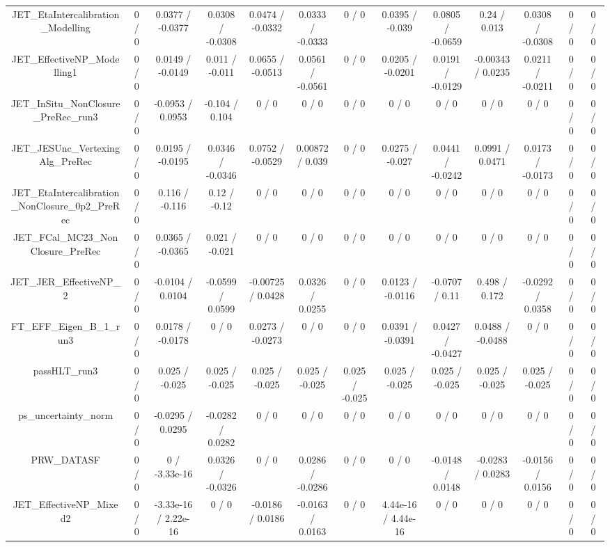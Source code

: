 \documentclass[10pt]{article}
\begin{document}
\begin{table}[htbp]
\begin{center}
\begin{tabular}{|c|c|c|c|c|c|c|c|c|c|c|c|c|}
  JET_EtaIntercalibration_Modelling & 0 / 0 & 0.0377 / -0.0377 & 0.0308 / -0.0308 & 0.0474 / -0.0332 & 0.0333 / -0.0333 & 0 / 0 & 0.0395 / -0.039 & 0.0805 / -0.0659 & 0.24 / 0.013 & 0.0308 / -0.0308 & 0 / 0 & 0 / 0 \\ 
  JET_EffectiveNP_Modelling1 & 0 / 0 & 0.0149 / -0.0149 & 0.011 / -0.011 & 0.0655 / -0.0513 & 0.0561 / -0.0561 & 0 / 0 & 0.0205 / -0.0201 & 0.0191 / -0.0129 & -0.00343 / 0.0235 & 0.0211 / -0.0211 & 0 / 0 & 0 / 0 \\ 
  JET_InSitu_NonClosure_PreRec_run3 & 0 / 0 & -0.0953 / 0.0953 & -0.104 / 0.104 & 0 / 0 & 0 / 0 & 0 / 0 & 0 / 0 & 0 / 0 & 0 / 0 & 0 / 0 & 0 / 0 & 0 / 0 \\ 
  JET_JESUnc_VertexingAlg_PreRec & 0 / 0 & 0.0195 / -0.0195 & 0.0346 / -0.0346 & 0.0752 / -0.0529 & 0.00872 / 0.039 & 0 / 0 & 0.0275 / -0.027 & 0.0441 / -0.0242 & 0.0991 / 0.0471 & 0.0173 / -0.0173 & 0 / 0 & 0 / 0 \\ 
  JET_EtaIntercalibration_NonClosure_0p2_PreRec & 0 / 0 & 0.116 / -0.116 & 0.12 / -0.12 & 0 / 0 & 0 / 0 & 0 / 0 & 0 / 0 & 0 / 0 & 0 / 0 & 0 / 0 & 0 / 0 & 0 / 0 \\ 
  JET_FCal_MC23_NonClosure_PreRec & 0 / 0 & 0.0365 / -0.0365 & 0.021 / -0.021 & 0 / 0 & 0 / 0 & 0 / 0 & 0 / 0 & 0 / 0 & 0 / 0 & 0 / 0 & 0 / 0 & 0 / 0 \\ 
  JET_JER_EffectiveNP_2 & 0 / 0 & -0.0104 / 0.0104 & -0.0599 / 0.0599 & -0.00725 / 0.0428 & 0.0326 / 0.0255 & 0 / 0 & 0.0123 / -0.0116 & -0.0707 / 0.11 & 0.498 / 0.172 & -0.0292 / 0.0358 & 0 / 0 & 0 / 0 \\ 
  FT_EFF_Eigen_B_1_run3 & 0 / 0 & 0.0178 / -0.0178 & 0 / 0 & 0.0273 / -0.0273 & 0 / 0 & 0 / 0 & 0.0391 / -0.0391 & 0.0427 / -0.0427 & 0.0488 / -0.0488 & 0 / 0 & 0 / 0 & 0 / 0 \\ 
  passHLT_run3 & 0 / 0 & 0.025 / -0.025 & 0.025 / -0.025 & 0.025 / -0.025 & 0.025 / -0.025 & 0.025 / -0.025 & 0.025 / -0.025 & 0.025 / -0.025 & 0.025 / -0.025 & 0.025 / -0.025 & 0 / 0 & 0 / 0 \\ 
  ps_uncertainty_norm & 0 / 0 & -0.0295 / 0.0295 & -0.0282 / 0.0282 & 0 / 0 & 0 / 0 & 0 / 0 & 0 / 0 & 0 / 0 & 0 / 0 & 0 / 0 & 0 / 0 & 0 / 0 \\ 
  PRW_DATASF & 0 / 0 & 0 / -3.33e-16 & 0.0326 / -0.0326 & 0 / 0 & 0.0286 / -0.0286 & 0 / 0 & 0 / 0 & -0.0148 / 0.0148 & -0.0283 / 0.0283 & -0.0156 / 0.0156 & 0 / 0 & 0 / 0 \\ 
  JET_EffectiveNP_Mixed2 & 0 / 0 & -3.33e-16 / 2.22e-16 & 0 / 0 & -0.0186 / 0.0186 & -0.0163 / 0.0163 & 0 / 0 & 4.44e-16 / 4.44e-16 & 0 / 0 & 0 / 0 & 0 / 0 & 0 / 0 & 0 / 0 \\ 

\end{tabular}
\end{center}
\end{table}
\end{document}
